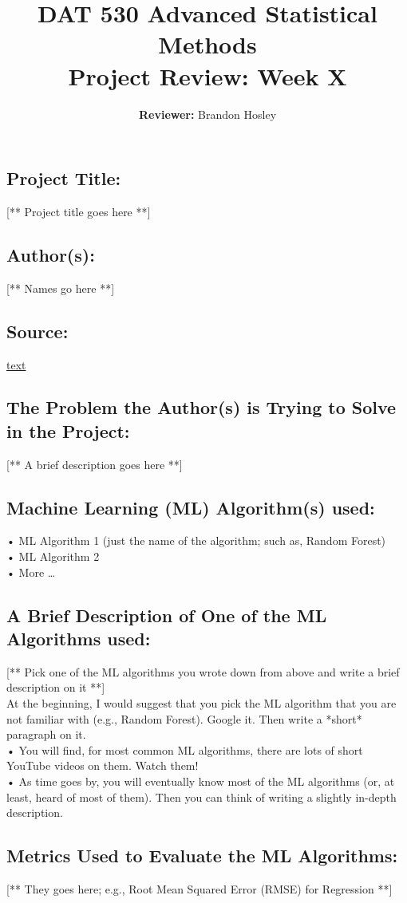 \documentclass[]{article}
\title{\textbf{DAT 530 Advanced Statistical Methods}\\
	\normalsize{Project Review: Week X} }
\author{\textbf{Reviewer: }
	Brandon Hosley}
\begin{document}
\setlength{\droptitle}{-10em} 
\pretitle{\begin{flushleft}\LARGE} %
	\posttitle{\end{flushleft}}
\preauthor{\begin{flushleft}\large} %
	\postauthor{\end{flushleft}}
\predate{\begin{flushleft}\large} %
	\postdate{\end{flushleft}}
\maketitle

\vspace{-2em}

\subsection*{Project Title:}
[** Project title goes here **]

\subsection*{Author(s):}
[** Names go here **]

\subsection*{Source:}
\href{URL}{text}

\subsection*{The Problem the Author(s) is Trying to Solve in the Project:}
[** A brief description goes here **]

\subsection*{Machine Learning (ML) Algorithm(s) used:}
• ML Algorithm 1 (just the name of the algorithm; such as, Random Forest) \\
• ML Algorithm 2 \\
• More … 

\subsection*{A Brief Description of One of the ML Algorithms used:}
[** Pick one of the ML algorithms you wrote down from above and write a brief description on it **] \\
At the beginning, I would suggest that you pick the ML algorithm that you are not familiar with (e.g., Random Forest). Google it. Then write a *short* paragraph on it. \\
• You will find, for most common ML algorithms, there are lots of short YouTube videos on them. Watch them! \\
• As time goes by, you will eventually know most of the ML algorithms (or, at least, heard of most of them). Then you can think of writing a slightly in-depth description. 

\subsection*{Metrics Used to Evaluate the ML Algorithms:}
[** They goes here; e.g., Root Mean Squared Error (RMSE) for Regression **]
\end{document}
